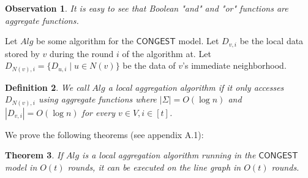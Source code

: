 \documentclass[11pt]{article}
\newtheorem{theorem}{Theorem}[section]
\newtheorem{observation}[theorem]{Observation}
\newtheorem{definition}[theorem]{Definition}
\newcommand{\Dvi}{D_{v,i}}
\newcommand{\Dui}{D_{u,i}}
\newcommand{\Dnvi}{D_{N(v),i}}
\begin{document}
\begin{observation}
	\label{col:bool-dec}
	It is easy to see that Boolean "and" and "or" functions are aggregate functions.
\end{observation}

Let $Alg$ be some algorithm for the $\mathsf{CONGEST}$ model. Let $\Dvi$ be the local data stored by $v$ during the round $i$ of the algorithm at. Let $\Dnvi= \{\Dui \mid u\in N(v) \}$ be the data of $v$'s immediate neighborhood.
\begin{definition}
	We call $Alg$ a \emph{local aggregation algorithm} if it only accesses $\Dnvi$ using aggregate functions where $|\Sigma| = O(\log n)$ and $|\Dvi|=O(\log n)$ for every $v \in V, i \in [t]$.
\end{definition}

We prove the following theorems (see appendix A.1):
\begin{theorem}
	\label{thm:aggregation-alg}
	If $Alg$ is a local aggregation algorithm running in the $\mathsf{CONGEST}$ model in $O(t)$ rounds, it can be executed on the line graph in $O(t)$ rounds.
\end{theorem}
%	
\end{document}

